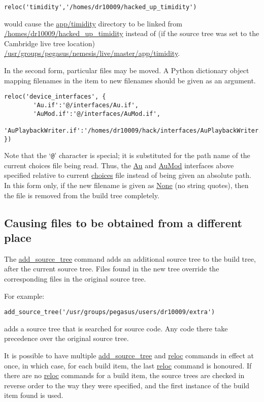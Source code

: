 \documentclass[a4paper]{article}
\begin{document}
\begin{verbatim}
reloc('timidity','/homes/dr10009/hacked_up_timidity')
\end{verbatim}

would cause the \url{app/timidity} directory to be linked from
\url{/homes/dr10009/hacked_up_timidity} instead of (if the source
tree was set to the Cambridge live tree location)
\url{/usr/groups/pegasus/nemesis/live/master/app/timidity}.

In the second form, particular files may be moved. A Python dictionary
object mapping filenames in the item to new filenames should be given
as an argument.

\begin{small}
\begin{verbatim}
reloc('device_interfaces', {
        'Au.if':'@/interfaces/Au.if',
        'AuMod.if':'@/interfaces/AuMod.if',
        'AuPlaybackWriter.if':'/homes/dr10009/hack/interfaces/AuPlaybackWriter.if'
})
\end{verbatim}
\end{small}

Note that the `\texttt{@}' character is special; it is substituted for the path
name of the current choices file being read. Thus, the \url{Au} and \url{AuMod}
interfaces above specified relative to current \url{choices} file
instead of being given an absolute path.
In this form only, if the new filename is given as \url{None} (no
string quotes), then the file is removed from the build tree completely.

\subsection{Causing files to be obtained from a different place}

The \url{add_source_tree} command adds an additional source tree to
the build tree, after the current source tree.  Files found in the
new tree override the corresponding files in the original source tree. 

For example:

\begin{verbatim}
add_source_tree('/usr/groups/pegasus/users/dr10009/extra')
\end{verbatim}

adds a source tree that is searched for source code. Any code there
take precedence over the original source tree. 

It is possible to have multiple \url{add_source_tree} and \url{reloc}
commands in effect at once, in which case, for each build item, the
last \url{reloc} command is honoured.  If there are no \url{reloc}
commands for a build item, the source trees are checked in
reverse order to the way they were specified, and the first instance
of the build item found is used. 
\end{document}
